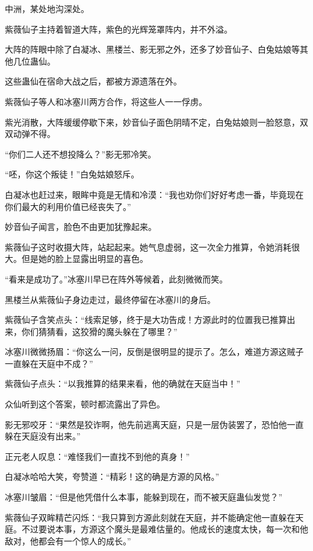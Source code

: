 
\begin{this_body}

中洲，某处地沟深处。

紫薇仙子主持着智道大阵，紫色的光辉笼罩阵内，并不外溢。

大阵的阵眼中除了白凝冰、黑楼兰、影无邪之外，还多了妙音仙子、白兔姑娘等其他几位蛊仙。

这些蛊仙在宿命大战之后，都被方源遗落在外。

紫薇仙子等人和冰塞川两方合作，将这些人一一俘虏。

紫光消散，大阵缓缓停歇下来，妙音仙子面色阴晴不定，白兔姑娘则一脸怒意，双双动弹不得。

“你们二人还不想投降么？”影无邪冷笑。

“呸，你这个叛徒！”白兔姑娘怒斥。

白凝冰也赶过来，眼眸中竟是无情和冷漠：“我也劝你们好好考虑一番，毕竟现在你们最大的利用价值已经丧失了。”

妙音仙子闻言，脸色不由更加犹豫起来。

紫薇仙子这时收摄大阵，站起起来。她气息虚弱，这一次全力推算，令她消耗很大。但是她的脸上显露出明显的喜色。

“看来是成功了。”冰塞川早已在阵外等候着，此刻微微而笑。

黑楼兰从紫薇仙子身边走过，最终停留在冰塞川的身后。

紫薇仙子含笑点头：“线索足够，终于是大功告成！方源此时的位置我已推算出来，你们猜猜看，这狡猾的魔头躲在了哪里？”

冰塞川微微扬眉：“你这么一问，反倒是很明显的提示了。怎么，难道方源这贼子一直躲在天庭中不成？”

紫薇仙子点头：“以我推算的结果来看，他的确就在天庭当中！”

众仙听到这个答案，顿时都流露出了异色。

影无邪咬牙：“果然是狡诈啊，他先前逃离天庭，只是一层伪装罢了，恐怕他一直躲在天庭没有出来。”

正元老人叹息：“难怪我们一直找不到他的真身！”

白凝冰哈哈大笑，夸赞道：“精彩！这的确是方源的风格。”

冰塞川皱眉：“但是他凭借什么本事，能躲到现在，而不被天庭蛊仙发觉？”

紫薇仙子双眸精芒闪烁：“我只算到方源此刻就在天庭，并不能确定他一直躲在天庭。不过要说本事，方源这个魔头是最难估量的。他成长的速度太快，每一次和他敌对，他都会有一个惊人的成长。”


\end{this_body}
